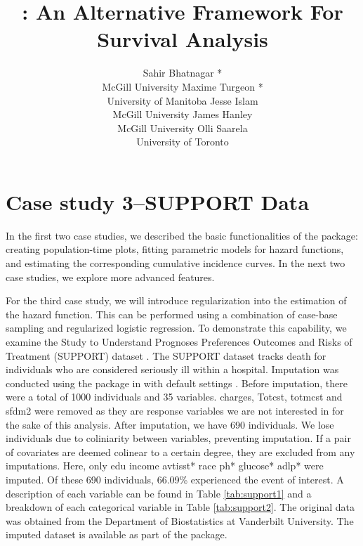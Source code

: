 \documentclass[
]{jss}
\author{
Sahir Bhatnagar *\\McGill University \And Maxime Turgeon *\\University of Manitoba \AND Jesse Islam\\McGill University \And James Hanley\\McGill University \And Olli Saarela\\University of Toronto
}
\title{\pkg{casebase}: An Alternative Framework For Survival Analysis}
\begin{document}
\hypertarget{case-study-3support-data}{%
\section{Case study 3--SUPPORT Data}\label{case-study-3support-data}}

In the first two case studies, we described the basic functionalities of
the  package: creating population-time plots, fitting
parametric models for hazard functions, and estimating the corresponding
cumulative incidence curves. In the next two case studies, we explore
more advanced features.

For the third case study, we will introduce regularization into the
estimation of the hazard function. This can be performed using a
combination of case-base sampling and regularized logistic regression.
To demonstrate this capability, we examine the Study to Understand
Prognoses Preferences Outcomes and Risks of Treatment (SUPPORT) dataset
\citep{knaus1995support}. The SUPPORT dataset tracks death for
individuals who are considered seriously ill within a hospital.
Imputation was conducted using the  package in 
with default settings \citep{mice}. Before imputation, there were a
total of 1000 individuals and 35 variables. charges, Totcst, totmcst and
sfdm2 were removed as they are response variables we are not interested
in for the sake of this analysis. After imputation, we have 690
individuals. We lose individuals due to coliniarity between variables,
preventing imputation. If a pair of covariates are deemed colinear to a
certain degree, they are excluded from any imputations. Here, only edu
income avtisst* race ph* glucose* adlp* were imputed. Of these 690
individuals, 66.09\% experienced the event of interest. A description of
each variable can be found in Table \ref{tab:support1} and a breakdown
of each categorical variable in Table \ref{tab:support2}. The original
data was obtained from the Department of Biostatistics at Vanderbilt
University. The imputed dataset is available as part of the
 package.
\end{document}
